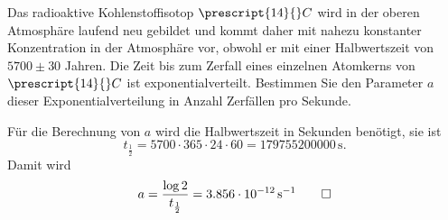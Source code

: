 Das radioaktive Kohlenstoffisotop $\prescript{14}{}C$ wird in der
oberen Atmosphäre laufend neu gebildet und kommt daher mit nahezu
konstanter Konzentration in der Atmosphäre vor, obwohl er mit einer
Halbwertszeit von $5700\pm 30$ Jahren.
Die Zeit bis zum Zerfall eines einzelnen Atomkerns von $\prescript{14}{}C$ 
ist exponentialverteilt. 
Bestimmen Sie den Parameter $a$ dieser Exponentialverteilung in
Anzahl Zerfällen pro Sekunde.

\begin{loesung}
Für die Berechnung von $a$ wird die Halbwertszeit in Sekunden benötigt,
sie ist
\[
t_{\frac12}
=
5700 \cdot 365 \cdot 24 \cdot 60
=
179755200000\,\text{s}.
\]
Damit wird
\[
a
=
\frac{\log 2}{t_{\frac12}}
=
3.856 \cdot 10^{-12}\,\text{s}^{-1}
\qedhere
\]
\end{loesung}


